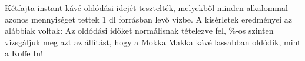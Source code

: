 Kétfajta instant kávé oldódási idejét tesztelték, melyekből minden alkalommal
azonos mennyiséget tettek 1 dl forrásban levő vízbe. A kísérletek eredményei
az alábbiak voltak:
Az oldódási időket normálisnak tételezve fel, \%-os szinten vizsgáljuk meg
azt az állítást, hogy a Mokka Makka kávé lassabban oldódik, mint a Koffe In!
